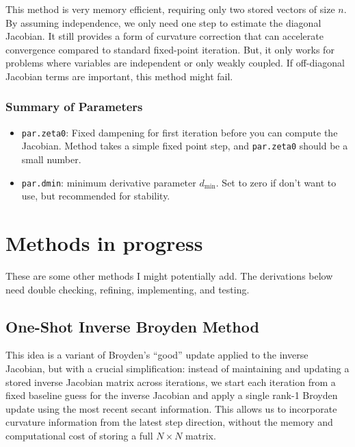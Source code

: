 \documentclass[a4paper,12pt]{article}
\newcommand{\code}[1]{\texttt{#1}}
\begin{document}
This method is very memory efficient, requiring only two stored vectors of size \( n \). By assuming independence, we only need one step to estimate the diagonal Jacobian. It still provides a form of curvature correction that can accelerate convergence compared to standard fixed-point iteration. But, it only works for problems where variables are independent or only weakly coupled. If off-diagonal Jacobian terms are important, this method might fail.  

\subsubsection{Summary of Parameters}
\begin{itemize}
    \item \code{par.zeta0}: Fixed dampening for first iteration before you can compute the Jacobian. Method takes a simple fixed point step, and \code{par.zeta0} should be a small number. 
    \item \code{par.dmin}: minimum derivative parameter $d_{\min}$. Set to zero if don't want to use, but recommended for stability. 
\end{itemize}







\clearpage
\appendix

{\centering {} \par}

\setcounter{page}{1}
\setcounter{equation}{0} 


\section{Methods in progress}

These are some other methods I might potentially add. The derivations below need double checking, refining, implementing, and testing. 

\subsection{One-Shot Inverse Broyden Method}

This idea is a variant of Broyden's ``good'' update applied to the inverse Jacobian, but with a crucial simplification: instead of maintaining and updating a stored inverse Jacobian matrix across iterations, we start each iteration from a fixed baseline guess for the inverse Jacobian and apply a single rank-1 Broyden update using the most recent secant information. This allows us to incorporate curvature information from the latest step direction, without the memory and computational cost of storing a full $N \times N$ matrix.
\end{document}
